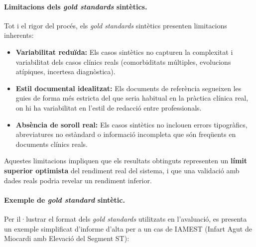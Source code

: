 \documentclass[CAT]{TFUOC}%
\begin{document}
\paragraph{Limitacions dels \textit{gold standards} sintètics.}
Tot i el rigor del procés, els \textit{gold standards} sintètics presenten limitacions inherents:
\begin{itemize}
    \item \textbf{Variabilitat reduïda:} Els casos sintètics no capturen la complexitat i variabilitat dels casos clínics reals (comorbiditats múltiples, evolucions atípiques, incertesa diagnòstica).
    \item \textbf{Estil documental idealitzat:} Els documents de referència segueixen les guies de forma més estricta del que seria habitual en la pràctica clínica real, on hi ha variabilitat en l'estil de redacció entre professionals.
    \item \textbf{Absència de soroll real:} Els casos sintètics no inclouen errors tipogràfics, abreviatures no estàndard o informació incompleta que són freqüents en documents clínics reals.
\end{itemize}

Aquestes limitacions impliquen que els resultats obtinguts representen un \textbf{límit superior optimista} del rendiment real del sistema, i que una validació amb dades reals podria revelar un rendiment inferior.

\paragraph{Exemple de \textit{gold standard} sintètic.}
Per il·lustrar el format dels \textit{gold standards} utilitzats en l'avaluació, es presenta un exemple simplificat d'informe d'alta per a un cas de IAMEST (Infart Agut de Miocardi amb Elevació del Segment ST):
\end{document}
